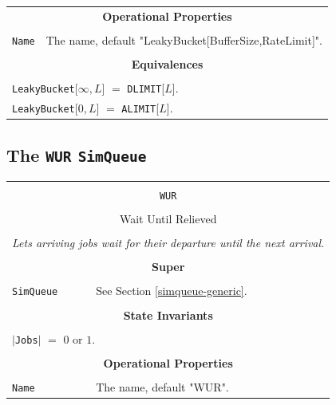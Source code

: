 \documentclass[12pt]{book}
\begin{document}
\begin{tabular}{|l|l|l|l|}
\multicolumn{4}{|c|}{\bf Operational Properties} \\
\multicolumn{4}{|c|}{} \\
\hline
\multicolumn{3}{|l|}{\lstinline|Name|} & The name, default "LeakyBucket[BufferSize,RateLimit]". \\
\hline
\multicolumn{4}{|c|}{} \\
\multicolumn{4}{|c|}{\bf Equivalences} \\
\multicolumn{4}{|c|}{} \\
\hline
\multicolumn{4}{|l|}{\lstinline|LeakyBucket|[$\infty, L$] $=$ \lstinline|DLIMIT|[$L$].} \\
\multicolumn{4}{|l|}{\lstinline|LeakyBucket|[$0, L$] $=$ \lstinline|ALIMIT|[$L$].} \\
\hline
\end{tabular}

\subsection{The \lstinline{WUR} \lstinline{SimQueue}}

\begin{tabular}{|l|l|l|l|}
\hline
\multicolumn{4}{|c|}{} \\
\multicolumn{4}{|c|}{\lstinline[basicstyle=\large]{WUR}} \\
\multicolumn{4}{|c|}{} \\
\multicolumn{4}{|c|}{Wait Until Relieved} \\
\multicolumn{4}{|c|}{} \\
\hline
\multicolumn{4}{|l|}{\em Lets arriving jobs wait for their departure until the next arrival.} \\
\hline
\multicolumn{4}{|c|}{} \\
\multicolumn{4}{|c|}{\bf Super} \\
\multicolumn{4}{|c|}{} \\
\hline
\lstinline|SimQueue| & \multicolumn{3}{|l|}{See Section \ref{simqueue-generic}.} \\
\hline
\multicolumn{4}{|c|}{} \\
\multicolumn{4}{|c|}{\bf State  Invariants} \\
\multicolumn{4}{|c|}{} \\
\hline
\multicolumn{4}{|l|}{$|$\lstinline|Jobs|$|$ $=$ $0$ or $1$.} \\
\hline
\multicolumn{4}{|c|}{} \\
\multicolumn{4}{|c|}{\bf Operational Properties} \\
\multicolumn{4}{|c|}{} \\
\hline
\multicolumn{3}{|l|}{\lstinline|Name|} & The name, default "WUR". \\
\hline
\end{tabular}
\end{document}
